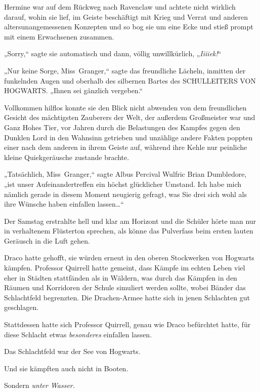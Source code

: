 {\later

Hermine war auf dem Rückweg nach Ravenclaw und achtete nicht wirklich darauf, wohin sie lief, im Geiste beschäftigt mit Krieg und Verrat und anderen altersunangemessenen Konzepten und so bog sie um eine Ecke und stieß prompt mit einem Erwachsenen zusammen.

„Sorry,“ sagte sie automatisch und dann, völlig unwillkürlich, „\emph{Iiiiek!}“

„Nur keine Sorge, Miss~Granger,“ sagte das freundliche Lächeln, inmitten der funkelnden Augen und oberhalb des silbernen Bartes des SCHULLEITERS VON HOGWARTS. „Ihnen sei gänzlich vergeben.“

Vollkommen hilflos konnte sie den Blick nicht abwenden von dem freundlichen Gesicht des mächtigsten Zauberers der Welt, der außerdem Großmeister war und Ganz Hohes Tier, vor Jahren durch die Belastungen des Kampfes gegen den Dunklen Lord in den Wahnsinn getrieben und unzählige andere Fakten poppten einer nach dem anderen in ihrem Geiste auf, während ihre Kehle nur peinliche kleine Quiekgeräusche zustande brachte.

„Tatsächlich, Miss~Granger,“ sagte Albus Percival Wulfric Brian Dumbledore, „ist unser Aufeinandertreffen ein höchst glücklicher Umstand. Ich habe mich nämlich gerade in diesem Moment neugierig gefragt, was Sie drei sich wohl als ihre Wünsche haben einfallen lassen…“

\later

Der Samstag erstrahlte hell und klar am Horizont und die Schüler hörte man nur in verhaltenem Flüsterton sprechen, als könne das Pulverfass beim ersten lauten Geräusch in die Luft gehen.

\later

Draco hatte gehofft, sie würden erneut in den oberen Stockwerken von Hogwarts kämpfen. Professor Quirrell hatte gemeint, dass Kämpfe im echten Leben viel eher in Städten stattfänden als in Wäldern, was durch das Kämpfen in den Räumen und Korridoren der Schule simuliert werden sollte, wobei Bänder das Schlachtfeld begrenzten. Die Drachen-Armee hatte sich in jenen Schlachten gut geschlagen.

Stattdessen hatte sich Professor Quirrell, genau wie Draco befürchtet hatte, für diese Schlacht etwas \emph{besonderes} einfallen lassen.

Das Schlachtfeld war der See von Hogwarts.

Und sie kämpften auch nicht in Booten.

Sondern \emph{unter Wasser.}

}
